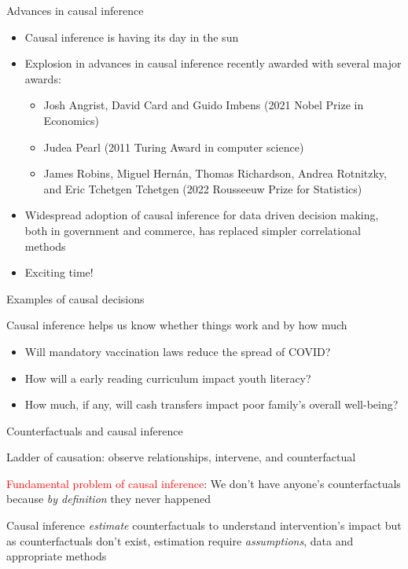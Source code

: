 \documentclass{beamer}
\begin{document}
\begin{frame}{Advances in causal inference}

\begin{itemize}
\item Causal inference is having its day in the sun
\item Explosion in advances in causal inference recently awarded with several major awards: 
	\begin{itemize}
	\item Josh Angrist, David Card and Guido Imbens (2021 Nobel Prize in Economics)
	\item Judea Pearl (2011 Turing Award in computer science)
	\item James Robins, Miguel Hernán, Thomas Richardson, Andrea Rotnitzky, and Eric Tchetgen Tchetgen (2022 Rousseeuw Prize for Statistics)
	\end{itemize}
\item Widespread adoption of causal inference for data driven decision making, both in government and commerce, has replaced simpler correlational methods
\item Exciting time!
\end{itemize}

\end{frame}



\begin{frame}{Examples of causal decisions}

Causal inference helps us know whether things work and by how much

 
\bigskip


\begin{itemize}
\item  Will mandatory vaccination laws reduce the spread of COVID?
\item  How will a early reading curriculum impact youth literacy?  
\item  How much, if any, will cash transfers impact poor family's overall well-being?
\end{itemize}


\end{frame}


\begin{frame}{Counterfactuals and causal inference}

 Ladder of causation: observe relationships, intervene, and counterfactual

\bigskip

\textcolor{red}{Fundamental problem of causal inference}: We don't have anyone's counterfactuals because \emph{by definition} they never happened

\bigskip

Causal inference \emph{estimate} counterfactuals to understand intervention's impact but as counterfactuals don't exist, estimation require \emph{assumptions}, data and appropriate methods


\end{frame}
\end{document}

